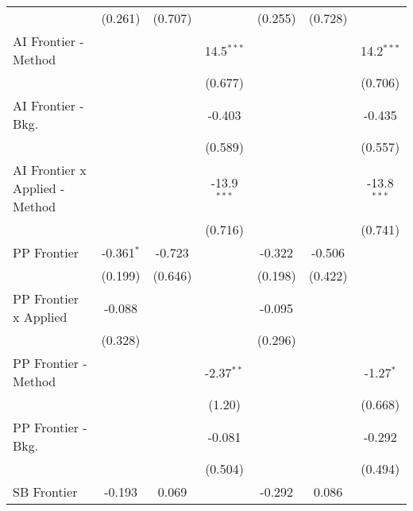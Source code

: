 \begin{tabular}{lcccccc}
                                  & (0.261)        & (0.707)       &               & (0.255)        & (0.728)       &   \\   
   AI Frontier - Method           &                &               & 14.5$^{***}$  &                &               & 14.2$^{***}$\\   
                                  &                &               & (0.677)       &                &               & (0.706)\\   
   AI Frontier - Bkg.             &                &               & -0.403        &                &               & -0.435\\   
                                  &                &               & (0.589)       &                &               & (0.557)\\   
   AI Frontier x Applied - Method &                &               & -13.9$^{***}$ &                &               & -13.8$^{***}$\\   
                                  &                &               & (0.716)       &                &               & (0.741)\\   
   PP Frontier                    & -0.361$^{*}$   & -0.723        &               & -0.322         & -0.506        &   \\   
                                  & (0.199)        & (0.646)       &               & (0.198)        & (0.422)       &   \\   
   PP Frontier x Applied          & -0.088         &               &               & -0.095         &               &   \\   
                                  & (0.328)        &               &               & (0.296)        &               &   \\   
   PP Frontier - Method           &                &               & -2.37$^{**}$  &                &               & -1.27$^{*}$\\   
                                  &                &               & (1.20)        &                &               & (0.668)\\   
   PP Frontier - Bkg.             &                &               & -0.081        &                &               & -0.292\\   
                                  &                &               & (0.504)       &                &               & (0.494)\\   
   SB Frontier                    & -0.193         & 0.069         &               & -0.292         & 0.086         &   \\   

\end{tabular}
